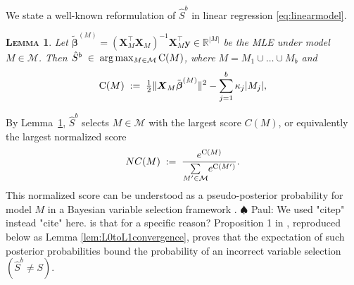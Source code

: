 \documentclass[aos]{imsart}
\theoremstyle{plain}
\newtheorem{lem}{\textsc{Lemma}}[section]
\newcommand{\paul}[1]{{\small{\color{green} \sf $\spadesuit$ Paul: #1}}}
\newcommand{\R}{\mathbb{R}}
\newcommand{\bs}{\boldsymbol}
\begin{document}
We state a well-known %
reformulation of $\hat S^b$ in linear regression \eqref{eq:linearmodel}. %
\begin{lem}\label{lem:useful-reformulation} Let $\tilde{\bs \beta}^{(M)}= (\bs X_{\!\!M}^\top \bs X_{\!\!M})^{-1}\bs X_{\!\!M}^\top\bs y \in \R^{|M|}$ be the MLE under model $M\in \mathcal{M}$. Then $\hat S^b\;\in\;\arg\max_{M\in \mathcal{M}} {\rm C}(M)$, where $M=M_1\cup \ldots\cup M_b$ and
\begin{equation}\label{eq:CM}
    {\rm C}(M)\;: =\;\tfrac{1}{2}\|\bs X_M\tilde{\bs\beta}^{(M)}\|^2-\sum_{j=1}^b\kappa_j |M_j|,
\end{equation}
\end{lem}
By Lemma~\ref{lem:useful-reformulation}, $\hat S^b$ selects %
$M\in \mathcal{M}$ with the largest score $C(M)$, or equivalently the largest normalized score
\begin{equation}\label{eq:normalizedscore}
    NC(M)\;:=\;\frac{e^{{\rm C}(M)}}{\underset{M' \in \mathcal{M}}{\sum} e^{{\rm C}(M')}}.
\end{equation}
This normalized score can be understood as a pseudo-posterior probability for model $M$ in a Bayesian variable selection framework \citep{BIC}. \paul{We used "citep" instead "cite" here. is that for a specific reason?}
Proposition 1 in \cite{rossell2022concentration}, reproduced below as Lemma \ref{lem:L0toL1convergence}, proves that the expectation of such posterior probabilities bound
the probability of an incorrect variable selection $(\hat S^b\neq S)$. 
\end{document}
